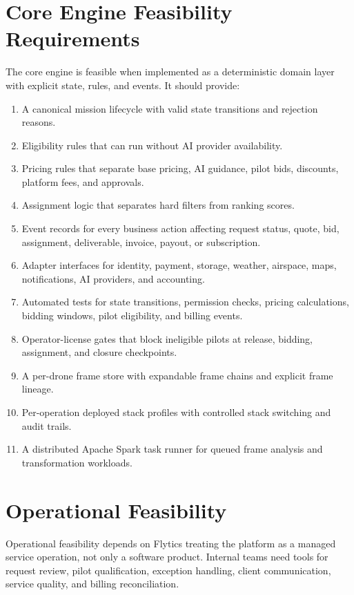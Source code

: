 \documentclass[11pt,a4paper]{article}
\begin{document}
\section{Core Engine Feasibility Requirements}

The core engine is feasible when implemented as a deterministic domain layer with explicit state, rules, and events. It should provide:

\begin{enumerate}[leftmargin=*]
    \item A canonical mission lifecycle with valid state transitions and rejection reasons.
    \item Eligibility rules that can run without AI provider availability.
    \item Pricing rules that separate base pricing, AI guidance, pilot bids, discounts, platform fees, and approvals.
    \item Assignment logic that separates hard filters from ranking scores.
    \item Event records for every business action affecting request status, quote, bid, assignment, deliverable, invoice, payout, or subscription.
    \item Adapter interfaces for identity, payment, storage, weather, airspace, maps, notifications, AI providers, and accounting.
    \item Automated tests for state transitions, permission checks, pricing calculations, bidding windows, pilot eligibility, and billing events.
    \item Operator-license gates that block ineligible pilots at release, bidding, assignment, and closure checkpoints.
    \item A per-drone frame store with expandable frame chains and explicit frame lineage.
    \item Per-operation deployed stack profiles with controlled stack switching and audit trails.
    \item A distributed Apache Spark task runner for queued frame analysis and transformation workloads.
\end{enumerate}

\section{Operational Feasibility}

Operational feasibility depends on Flytics treating the platform as a managed service operation, not only a software product. Internal teams need tools for request review, pilot qualification, exception handling, client communication, service quality, and billing reconciliation.
\end{document}
